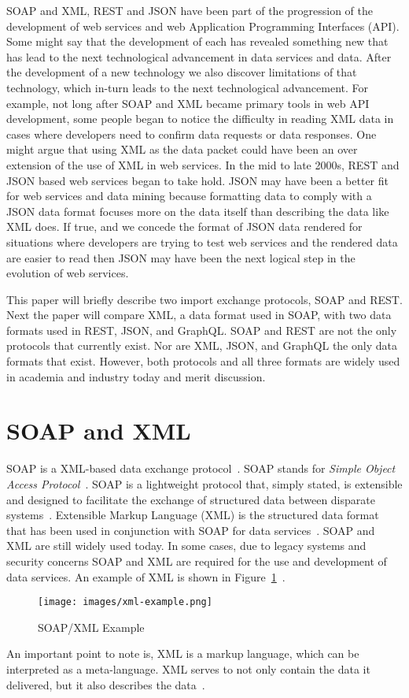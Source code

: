 SOAP and XML, REST and JSON have been part of the progression of the development
of web services and web Application Programming Interfaces (API).  Some might 
say that the development of each has revealed something new that has lead to 
the next technological advancement in data services and data.  After the 
development of a new technology we also discover limitations of that 
technology, which in-turn leads to the next technological advancement.  For 
example, not long after SOAP and XML became primary tools in web API 
development, some people began to notice the difficulty in reading XML data in 
cases where developers need to confirm data requests or data responses.  One 
might argue that using XML as the data packet could have been an over extension 
of the use of XML in web services.  In the mid to late 2000s, REST and JSON 
based web services began to take hold.  JSON may have been a better fit for 
web services and data mining because formatting data to comply with a JSON 
data format focuses more on the data itself than describing the data like XML 
does.  If true, and we concede the format of JSON data rendered for situations 
where developers are trying to test web services and the rendered data are 
easier to read then JSON may have been the next logical step in the evolution 
of web services.  

This paper will briefly describe two import exchange protocols, SOAP and REST.  
Next the paper will compare XML, a data format used in SOAP, with two data
formats used in REST, JSON, and GraphQL.  SOAP and REST are not the only
protocols that currently exist.  Nor are XML, JSON, and GraphQL the only data
formats that exist.  However, both protocols and all three formats are widely
used in academia and industry today and merit discussion.  

\section{SOAP and XML}
SOAP is a XML-based data exchange protocol~\cite{hid505Quaine2007}.  SOAP stands for
\emph{Simple Object Access Protocol}~\cite{hid505Microsoft2018}.  SOAP is a lightweight
protocol that, simply stated, is extensible and designed to facilitate the
exchange of structured data between disparate systems~\cite{hid505Microsoft2018}.
Extensible Markup Language (XML) is the structured data format that has been
used in conjunction with SOAP for data services~\cite{hid505Walsh1998}.  SOAP and XML
are still widely used today.  In some cases, due to legacy systems and security
concerns SOAP and XML are required for the use and development of data services.
An example of XML is shown in Figure~\ref{f:xml-example}~\cite{hid505WikipidiaXML1028}.
\begin{figure}[!ht]
  \centering\texttt{[image: images/xml-example.png]}
  \caption{SOAP/XML Example}\label{f:xml-example}
\end{figure}
An important point to note is, XML is a markup language, which can be
interpreted as a meta-language.  XML serves to not only contain the data it
delivered, but it also describes the data~\cite{hid505Aihkisalo2012}.

